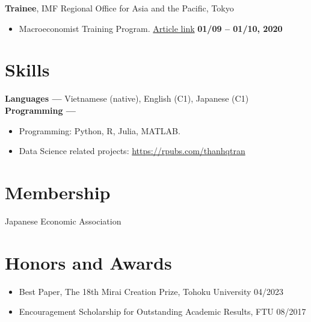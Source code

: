 \documentclass[margin,line]{res}
\begin{document}
\begin{resume}
\vspace*{.05in}
{\bf Trainee}, IMF Regional Office for Asia and the Pacific, Tokyo
\vspace*{.05in}
\begin{itemize}
\item[ ] Macroeconomist Training Program. \href{https://www.imf.org/en/Countries/ResRep/OAP-Home/~/link.aspx?_id=C2F64E8412B64A86BD37DDEB8439312B&_z=z}{Article link} \hfill {\bf 01/09 -- 01/10, 2020}
\end{itemize}

\vspace{4mm}








\section{\sc Skills}
{\bf Languages ---}
\vspace*{.05in}
Vietnamese (native), English (C1), Japanese (C1)\\
{\bf Programming ---}
\vspace*{.05in}
\begin{itemize}
	\item Programming: Python, R, Julia, MATLAB.
	\item Data Science related projects: \url{https://rpubs.com/thanhqtran}
\end{itemize}

\vspace{4mm}

\section{\sc Membership}
 Japanese Economic Association \\

\section{\sc Honors and Awards}
\begin{itemize}
\item[] Best Paper, The 18th Mirai Creation Prize, Tohoku University \hfill 04/2023
\item[] Encouragement Scholarship for Outstanding Academic Results, FTU \hfill 08/2017
\end{itemize}


\end{resume}
\end{document}
